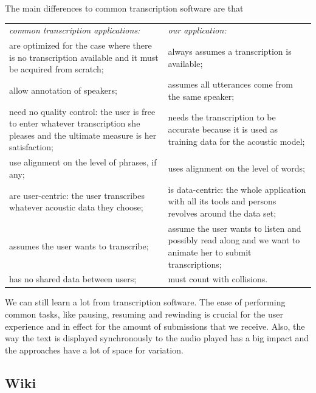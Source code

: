 \documentclass{svproc}
\begin{document}
The main differences to common transcription software are that

\noindent
\begin{tabularx}{\textwidth}{
    @{\hspace{1.5em}}%
    >{\leavevmode\llap{\textbullet~}\raggedright}%
    X%
    @{\quad\hspace{1.5em}}%
    >{\leavevmode\llap{\textbullet~}\raggedright\arraybackslash}%
    X%
    @{}%
  }
  \em{common transcription applications}: & \em{our application}: \\
  are optimized for the case where there is no transcription available and it
  must be acquired from scratch; &
    always assumes a transcription is available; \\
  allow annotation of speakers; &
    assumes all utterances come from the same speaker; \\
  need no quality control: the user is free to enter whatever transcription she
  pleases and the ultimate measure is her satisfaction; &
    needs the transcription to be accurate because it is used as training data
    for the acoustic model; \\
  use alignment on the level of phrases, if any; &
    uses alignment on the level of words; \\
  are user-centric: the user transcribes whatever acoustic data they choose; &
    is data-centric: the whole application with all its tools and persons
    revolves around the data set; \\
  assumes the user wants to transcribe; &
    assume the user wants to listen and possibly read along and we want to
    animate her to submit transcriptions; \\
  has no shared data between users; &
    must count with collisions.
\end{tabularx}

We can still learn a lot from transcription software. The ease of performing
common tasks, like pausing, resuming and rewinding is crucial for the user
experience and in effect for the amount of submissions that we receive. Also,
the way the text is displayed synchronously to the audio played has a big impact
and the approaches have a lot of space for variation.

\subsection{Wiki}
\end{document}
